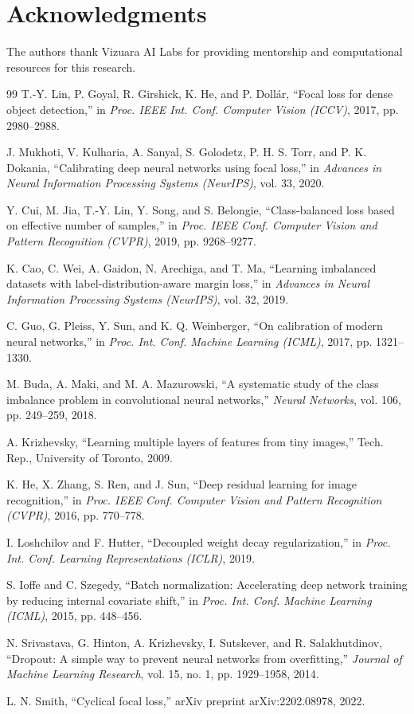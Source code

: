 \documentclass[conference]{IEEEtran}
\begin{document}
\section*{Acknowledgments}
The authors thank Vizuara AI Labs for providing mentorship and computational resources for this
research.

\begin{thebibliography}{99}
T.-Y. Lin, P. Goyal, R. Girshick, K. He, and P. Doll\'ar,
``Focal loss for dense object detection,''
in \textit{Proc. IEEE Int. Conf. Computer Vision (ICCV)}, 2017, pp. 2980--2988.

J. Mukhoti, V. Kulharia, A. Sanyal, S. Golodetz, P. H. S. Torr, and P. K. Dokania,
``Calibrating deep neural networks using focal loss,''
in \textit{Advances in Neural Information Processing Systems (NeurIPS)}, vol. 33, 2020.

Y. Cui, M. Jia, T.-Y. Lin, Y. Song, and S. Belongie,
``Class-balanced loss based on effective number of samples,''
in \textit{Proc. IEEE Conf. Computer Vision and Pattern Recognition (CVPR)}, 2019, pp. 9268--9277.

K. Cao, C. Wei, A. Gaidon, N. Arechiga, and T. Ma,
``Learning imbalanced datasets with label-distribution-aware margin loss,''
in \textit{Advances in Neural Information Processing Systems (NeurIPS)}, vol. 32, 2019.

C. Guo, G. Pleiss, Y. Sun, and K. Q. Weinberger,
``On calibration of modern neural networks,''
in \textit{Proc. Int. Conf. Machine Learning (ICML)}, 2017, pp. 1321--1330.

M. Buda, A. Maki, and M. A. Mazurowski,
``A systematic study of the class imbalance problem in convolutional neural networks,''
\textit{Neural Networks}, vol. 106, pp. 249--259, 2018.

A. Krizhevsky,
``Learning multiple layers of features from tiny images,''
Tech. Rep., University of Toronto, 2009.

K. He, X. Zhang, S. Ren, and J. Sun,
``Deep residual learning for image recognition,''
in \textit{Proc. IEEE Conf. Computer Vision and Pattern Recognition (CVPR)}, 2016, pp. 770--778.

I. Loshchilov and F. Hutter,
``Decoupled weight decay regularization,''
in \textit{Proc. Int. Conf. Learning Representations (ICLR)}, 2019.

S. Ioffe and C. Szegedy,
``Batch normalization: Accelerating deep network training by reducing internal covariate shift,''
in \textit{Proc. Int. Conf. Machine Learning (ICML)}, 2015, pp. 448--456.

N. Srivastava, G. Hinton, A. Krizhevsky, I. Sutskever, and R. Salakhutdinov,
``Dropout: A simple way to prevent neural networks from overfitting,''
\textit{Journal of Machine Learning Research}, vol. 15, no. 1, pp. 1929--1958, 2014.

L. N. Smith,
``Cyclical focal loss,''
arXiv preprint arXiv:2202.08978, 2022.
\end{thebibliography}
\end{document}

